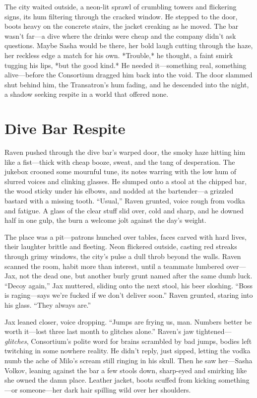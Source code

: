 \documentclass[12pt]{book}
\begin{document}
The city waited outside, a neon-lit sprawl of crumbling towers and flickering signs, its hum filtering through the cracked window. He stepped to the door, boots heavy on the concrete stairs, the jacket creaking as he moved. The bar wasn’t far—a dive where the drinks were cheap and the company didn’t ask questions. Maybe Sasha would be there, her bold laugh cutting through the haze, her reckless edge a match for his own. *Trouble,* he thought, a faint smirk tugging his lips, *but the good kind.* He needed it—something real, something alive—before the Consortium dragged him back into the void. The door slammed shut behind him, the Transatron’s hum fading, and he descended into the night, a shadow seeking respite in a world that offered none.

\section{Dive Bar Respite}

Raven pushed through the dive bar’s warped door, the smoky haze hitting him like a fist—thick with cheap booze, sweat, and the tang of desperation. The jukebox crooned some mournful tune, its notes warring with the low hum of slurred voices and clinking glasses. He slumped onto a stool at the chipped bar, the wood sticky under his elbows, and nodded at the bartender—a grizzled bastard with a missing tooth. “Usual,” Raven grunted, voice rough from vodka and fatigue. A glass of the clear stuff slid over, cold and sharp, and he downed half in one gulp, the burn a welcome jolt against the day’s weight.

The place was a pit—patrons hunched over tables, faces carved with hard lives, their laughter brittle and fleeting. Neon flickered outside, casting red streaks through grimy windows, the city’s pulse a dull throb beyond the walls. Raven scanned the room, habit more than interest, until a teammate lumbered over—Jax, not the dead one, but another burly grunt named after the same dumb luck. “Decoy again,” Jax muttered, sliding onto the next stool, his beer sloshing. “Boss is raging—says we’re fucked if we don’t deliver soon.” Raven grunted, staring into his glass. “They always are.”

Jax leaned closer, voice dropping. “Jumps are frying us, man. Numbers better be worth it—lost three last month to glitches alone.” Raven’s jaw tightened—\textit{glitches}, Consortium’s polite word for brains scrambled by bad jumps, bodies left twitching in some nowhere reality. He didn’t reply, just sipped, letting the vodka numb the ache of Milo’s scream still ringing in his skull. Then he saw her—Sasha Volkov, leaning against the bar a few stools down, sharp-eyed and smirking like she owned the damn place. Leather jacket, boots scuffed from kicking something—or someone—her dark hair spilling wild over her shoulders.
\end{document}
